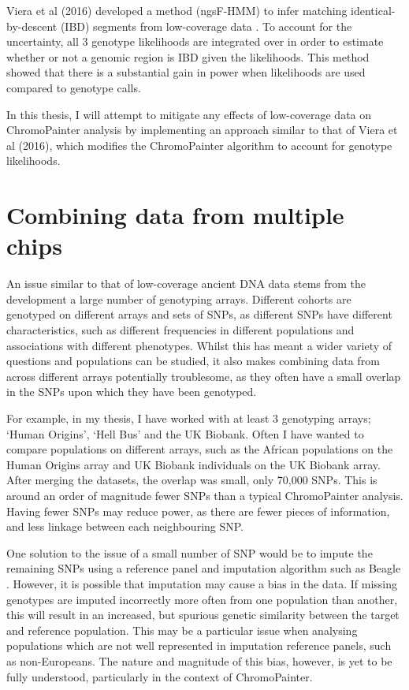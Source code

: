 Viera et al (2016) developed a method (ngsF-HMM) to infer matching identical-by-descent (IBD) segments from low-coverage data \cite{Vieira2016}. To account for the uncertainty, all 3 genotype likelihoods are integrated over in order to estimate whether or not a genomic region is IBD given the likelihoods. This method showed that there is a substantial gain in power when likelihoods are used compared to genotype calls.  

In this thesis, I will attempt to mitigate any effects of low-coverage data on ChromoPainter analysis by implementing an approach similar to that of Viera et al (2016), which modifies the ChromoPainter algorithm to account for genotype likelihoods.


\section{Combining data from multiple chips}

An issue similar to that of low-coverage ancient DNA data stems from the development a large number of genotyping arrays. Different cohorts are genotyped on different arrays and sets of SNPs, as different SNPs have different characteristics, such as different frequencies in different populations and associations with different phenotypes. Whilst this has meant a wider variety of questions and populations can be studied, it also makes combining data from across different arrays potentially troublesome, as they often have a small overlap in the SNPs upon which they have been genotyped.

For example, in my thesis, I have worked with at least 3 genotyping arrays; `Human Origins', `Hell Bus' and the UK Biobank. Often I have wanted to compare populations on different arrays, such as the African populations on the Human Origins array and UK Biobank individuals on the UK Biobank array. After merging the datasets, the overlap was small, only 70,000 SNPs. This is around an order of magnitude fewer SNPs than a typical ChromoPainter analysis. Having fewer SNPs may reduce power, as there are fewer pieces of information, and less linkage between each neighbouring SNP.

One solution to the issue of a small number of SNP would be to impute the remaining SNPs using a reference panel and imputation algorithm such as Beagle \cite{Browning2016}. However, it is possible that imputation may cause a bias in the data. If missing genotypes are imputed incorrectly more often from one population than another, this will result in an increased, but spurious genetic similarity between the target and reference population. This may be a particular issue when analysing populations which are not well represented in imputation reference panels, such as non-Europeans. The nature and magnitude of this bias, however, is yet to be fully understood, particularly in the context of ChromoPainter.


